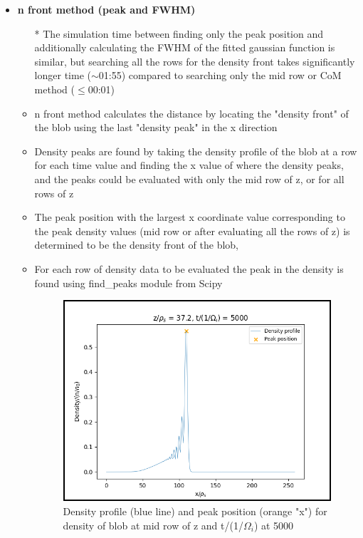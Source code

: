 \documentclass{article}
\begin{document}
\begin{arrowlist}
\begin{itemize}
            \item \textbf{n front method (peak and FWHM)}
            \begin{itemize}
                \item[*] The simulation time between finding only the peak position and additionally calculating the FWHM of the fitted gaussian function is similar, but searching all the rows for the density front takes significantly longer time ($\sim$01:55) compared to searching only the mid row or CoM method ($\leq$00:01)
                \item n front method calculates the distance by locating the "density front" of the blob using the last "density peak" in the x direction
                \item Density peaks are found by taking the density profile of the blob at a row for each time value and finding the x value of where the density peaks, and the peaks could be evaluated with only the mid row of z, or for all rows of z
                \item The peak position with the largest x coordinate value corresponding to the peak density values (mid row or after evaluating all the rows of z) is determined to be the density front of the blob, 
                \item For each row of density data to be evaluated the peak in the density is found using find\_peaks module from Scipy 
                
    \begin{figure}[H]
        \centering
        \includegraphics[height=0.4\textheight]{./Fig/Fig9 n front n peak plot.png}
        \normalsize{\caption{Density profile (blue line) and peak position (orange "x") for density of blob at mid row of z and t/(1/$\Omega_i$) at 5000}
        \label{fig:fig9}}
    \end{figure}  
    

\end{itemize}
\end{itemize}
\end{arrowlist}
\end{document}
